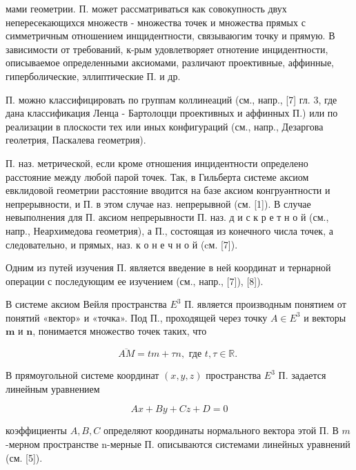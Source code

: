 \documentclass[10pt]{article}
\begin{document}
мами геометрии. П. может рассматриваться как совокупность двух непересекающихся множеств - множества точек и множества прямых с симметричным отношением инщидентности, связываюгим точку и прямую. В зависимости от требований, к-рым удовлетворяет отнотение инцидентности, описываемое определенными аксиомами, различают проективные, аффинные, гиперболические, эллиптические П. и др.



П. можно классифицировать по группам коллинеаций (см., напр., [7] гл. 3, где дана классификация Ленца - Бартолоцци проективных и аффинных П.) или по реализации в плоскости тех или иных конфигураций (см., напр., Дезаргова геолетрия, Паскалева геометрия).



П. наз. метрической, если кроме отношения инцидентности определено расстояние между любой парой точек. Так, в Гильберта системе аксиом евклидовой геометрии расстояние вводится на базе аксиом конгруәнтности и непрерывности, и П. в этом случае наз. непрерывной (см. [1]). В случае невыполнения для П. аксиом непрерывности П. наз. д и с к р е т н о й (см., напр., Неархимедова геометрия), а П., состоящая из конечного числа точек, а следовательно, и прямых, наз. к о н е ч н о й (cм. [7]).



Одним из путей изучения П. является введение в ней координат и тернарной операции с последующим ее изучением (см., напр., [7]), [8]).



В системе аксиом Вейля пространства $E^{3}$ П. является производным понятием от понятий «вектор» и «точка». Под П., проходящей через точку $A \in E^{3}$ и векторы $\mathbf{m}$ и $\mathbf{n}$, понимается множество точек таких, что



\[

\overline{A M}=t m+\tau n, \text { где } t, \tau \in \mathbb{R} \text {. }

\]



В прямоугольной системе координат $(x, y, z)$ пространства $E^{3}$ П. задается линейным уравнением



\[

A x+B y+C z+D=0

\]



коэффициенты $A, B, C$ определяют координаты нормального вектора этой П. В $m$-мерном пространстве n-мерные П. описываются системами линейных уравнений (см. [5]).
\end{document}
